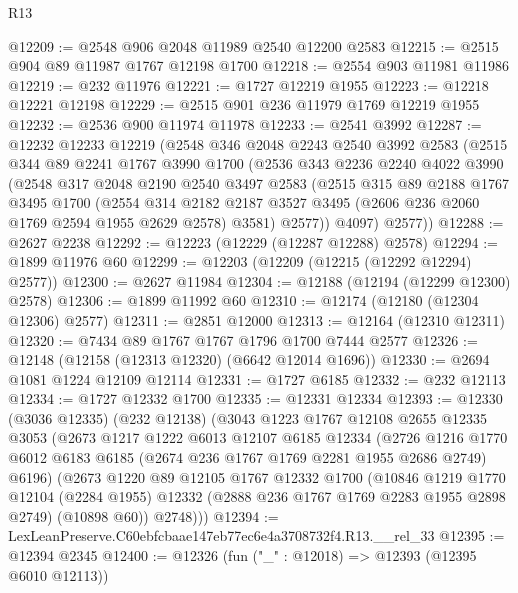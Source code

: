 \begin{lexlean}{R13}
\begin{coremodule}
@12209 := @2548 @906 @2048 @11989 @2540 @12200 @2583
@12215 := @2515 @904 @89 @11987 @1767 @12198 @1700
@12218 := @2554 @903 @11981 @11986
@12219 := @232 @11976
@12221 := @1727 @12219 @1955
@12223 := @12218 @12221 @12198
@12229 := @2515 @901 @236 @11979 @1769 @12219 @1955
@12232 := @2536 @900 @11974 @11978
@12233 := @2541 @3992
@12287 := @12232
    @12233
    @12219
    (@2548
      @346
      @2048
      @2243
      @2540
      @3992
      @2583
      (@2515
        @344
        @89
        @2241
        @1767
        @3990
        @1700
        (@2536
          @343
          @2236
          @2240
          @4022
          @3990
          (@2548
            @317
            @2048
            @2190
            @2540
            @3497
            @2583
            (@2515
              @315
              @89
              @2188
              @1767
              @3495
              @1700
              (@2554
                @314
                @2182
                @2187
                @3527
                @3495
                (@2606 @236 @2060 @1769 @2594 @1955 @2629 @2578)
                @3581)
              @2577))
          @4097)
        @2577))
@12288 := @2627 @2238
@12292 := @12223 (@12229 (@12287 @12288) @2578)
@12294 := @1899 @11976 @60
@12299 := @12203 (@12209 (@12215 (@12292 @12294) @2577))
@12300 := @2627 @11984
@12304 := @12188 (@12194 (@12299 @12300) @2578)
@12306 := @1899 @11992 @60
@12310 := @12174 (@12180 (@12304 @12306) @2577)
@12311 := @2851 @12000
@12313 := @12164 (@12310 @12311)
@12320 := @7434 @89 @1767 @1767 @1796 @1700 @7444 @2577
@12326 := @12148 (@12158 (@12313 @12320) (@6642 @12014 @1696))
@12330 := @2694 @1081 @1224 @12109 @12114
@12331 := @1727 @6185
@12332 := @232 @12113
@12334 := @1727 @12332 @1700
@12335 := @12331 @12334
@12393 := @12330
    (@3036 @12335)
    (@232 @12138)
    (@3043
      @1223
      @1767
      @12108
      @2655
      @12335
      @3053
      (@2673
        @1217
        @1222
        @6013
        @12107
        @6185
        @12334
        (@2726 @1216 @1770 @6012 @6183 @6185 (@2674 @236 @1767 @1769 @2281 @1955 @2686 @2749) @6196)
        (@2673
          @1220
          @89
          @12105
          @1767
          @12332
          @1700
          (@10846
            @1219
            @1770
            @12104
            (@2284 @1955)
            @12332
            (@2888 @236 @1767 @1769 @2283 @1955 @2898 @2749)
            (@10898 @60))
          @2748)))
@12394 := LexLeanPreserve.C60ebfcbaae147eb77ec6e4a3708732f4.R13.__rel_33
@12395 := @12394 @2345
@12400 := @12326 (fun ("_" : @12018) => @12393 (@12395 @6010 @12113))

\end{coremodule}
\end{lexlean}
